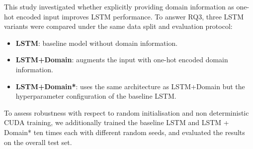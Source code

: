 \begin{itemize}
            This study investigated whether explicitly providing domain information as one-hot encoded input improves LSTM performance. To answer RQ3, three LSTM variants were compared under the same data split and evaluation protocol:\begin{itemize}
            \item \textbf{LSTM}: baseline model without domain information.
            \item \textbf{LSTM+Domain}: augments the input with one-hot encoded domain information.
            \item \textbf{LSTM+Domain*}: uses the same architecture as LSTM+Domain but the hyperparameter configuration of the baseline LSTM.
        \end{itemize}
                To assess robustness with respect to random initialisation and non deterministic CUDA training, we additionally trained the baseline LSTM and LSTM + Domain* ten times each with different random seeds, and evaluated the results on the overall test set.
        

        \end{itemize}



